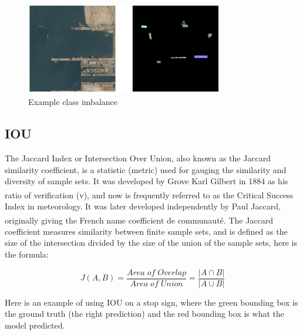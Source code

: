 \vspace{0.1in}

\begin{figure}[H]
\centering
  \vspace{-0.1in}
    \centerline{\includegraphics[width = 3.4in, height = 1.6in]{../images/class_imbalance.png}}
    \caption{Example class imbalance}
\end{figure}

\subsection{IOU}
\hspace{\parindent}
The Jaccard Index or Intersection Over Union, also known as the Jaccard similarity coefficient, is a statistic (metric) used for gauging the similarity and diversity of sample sets. It was developed by Grove Karl Gilbert in 1884 as his ratio of verification (v),\textsuperscript{\cite{murphy1996finley}} and now is frequently referred to as the Critical Success Index in meteorology. It was later developed independently by Paul Jaccard, originally giving the French name coefficient de communauté.\textsuperscript{\cite{jaccard1912distribution}} The Jaccard coefficient measures similarity between finite sample sets, and is defined as the size of the intersection divided by the size of the union of the sample sets, here is the formula:

\begin{equation}
    J(A,B) = \frac{Area\; of\; Overlap}{Area\; of\; Union} = \frac{|A \cap B|}{|A \cup B|}
\end{equation}

Here is an example of using IOU on a stop sign, where the green bounding box is the ground truth (the right prediction) and the red bounding box is what the model predicted.

\vspace{0.1in}

